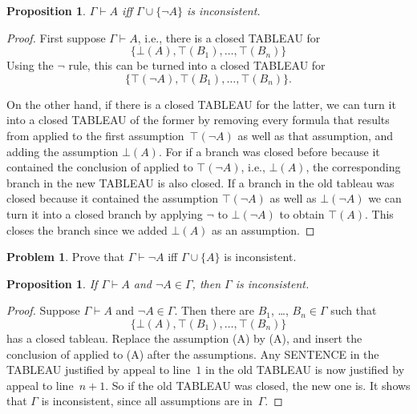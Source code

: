 \documentclass[10pt,a4paper]{article}
\newcommand*{\olup}[1]{\MakeUppercase{#1}}
\theoremstyle{plain}
\newtheorem{prop}[thm]{Proposition}
\theoremstyle{definition}
\newtheorem{prob}{Problem}[section]
\theoremstyle{remark}
\newcommand*{\ollabel}[1]{\label{#1}}
\providecommand{\Proves}{\mathrel{\vdash}}
\providecommand{\sFmla}[2]{#1(#2)}
\providecommand{\True}{\top}
\providecommand{\False}{\bot}
\providecommand{\TRule}[1]{}
\begin{document}
\begin{prop}
\ollabel{prop:prov-incons}
$\Gamma \Proves A$ iff $\Gamma \cup \{\lnot A\}$ is inconsistent.
\end{prop}

\begin{proof}
First suppose $\Gamma \Proves A$, i.e., there is
a closed \olup{tableau} for
\[
\{\sFmla{\False}{A},
\sFmla{\True}{B_1}, \dots, \sFmla{\True}{B_n}\}
\]
Using the $\TRule{\True}{\lnot}$ rule, this can be turned into a
closed \olup{tableau} for
\[
\{\sFmla{\True}{\lnot A},
\sFmla{\True}{B_1}, \dots, \sFmla{\True}{B_n}\}.
\]

On the other hand, if there is a closed \olup{tableau} for the latter, we
can turn it into a closed \olup{tableau} of the former by removing every
formula that results from \TRule{\True}{\lnot} applied to the first
assumption~$\sFmla{\True}{\lnot A}$ as well as that assumption, and
adding the assumption $\sFmla{\False}{A}$. For if a branch was closed
before because it contained the conclusion of \TRule{\True}{\lnot}
applied to $\sFmla{\True}{\lnot A}$, i.e., $\sFmla{\False}{A}$, the
corresponding branch in the new \olup{tableau} is also closed. If a
branch in the old tableau was closed because it contained the
assumption $\sFmla{\True}{\lnot A}$ as well as $\sFmla{\False}{\lnot
  A}$ we can turn it into a closed branch by applying
$\TRule{\False}{\lnot}$ to $\sFmla{\False}{\lnot A}$ to obtain
$\sFmla{\True}{A}$. This closes the branch since we added
$\sFmla{\False}{A}$ as an assumption.
\end{proof}

\begin{prob}
Prove that $\Gamma \Proves \lnot A$ iff $\Gamma \cup \{A\}$ is inconsistent.
\end{prob}

\begin{prop}\ollabel{prop:explicit-inc}
  If $\Gamma \Proves A$ and $\lnot A \in \Gamma$, then $\Gamma$ is
  inconsistent.
\end{prop}

\begin{proof}
  Suppose $\Gamma \Proves A$ and $\lnot A \in \Gamma$.  Then there
  are $B_1$, \dots, $B_n \in \Gamma$ such that \
  \[
  \{\sFmla{\False}{A}, \sFmla{\True}{B_1}, \dots, \sFmla{\True}{B_n}\}
  \]
  has a closed tableau. Replace the assumption \sFmla{\False}{A} by
  \sFmla{\True}{\lnot A}, and insert the conclusion of
  \TRule{\True}{\lnot} applied to \sFmla{\False}{A} after the
  assumptions. Any \olup{sentence} in the \olup{tableau} justified by appeal
  to line~$1$ in the old \olup{tableau} is now justified by appeal to
  line~$n+1$. So if the old \olup{tableau} was closed, the new one is.
  It shows that $\Gamma$ is inconsistent, since all assumptions are
  in~$\Gamma$.
\end{proof}
\end{document}

